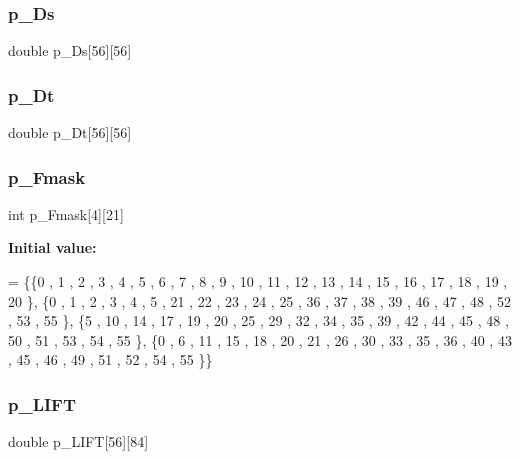 \mbox{\label{a00491_aedc2e177cc4c7f961baa3029cc154e21}} 
\subsubsection{\texorpdfstring{p\+\_\+\+Ds}{p\_Ds}}
{\footnotesize\ttfamily double p\+\_\+\+Ds\mbox{[}56\mbox{]}\mbox{[}56\mbox{]}}

\mbox{\label{a00491_ac1239fe5c431448283c668e5e0377a31}} 
\subsubsection{\texorpdfstring{p\+\_\+\+Dt}{p\_Dt}}
{\footnotesize\ttfamily double p\+\_\+\+Dt\mbox{[}56\mbox{]}\mbox{[}56\mbox{]}}

\mbox{\label{a00491_a4c7b47768e156451f6b08cb0023108ee}} 
\subsubsection{\texorpdfstring{p\+\_\+\+Fmask}{p\_Fmask}}
{\footnotesize\ttfamily int p\+\_\+\+Fmask\mbox{[}4\mbox{]}\mbox{[}21\mbox{]}}

{\bfseries Initial value\+:}
\begin{DoxyCode}
= \{\{0 , 1 , 2 , 3 , 4 , 5 , 6 , 7 , 8 , 9 , 10 , 11 , 12 , 13 , 14 , 15 , 16 , 17 , 18 , 19 , 20 \},
\{0 , 1 , 2 , 3 , 4 , 5 , 21 , 22 , 23 , 24 , 25 , 36 , 37 , 38 , 39 , 46 , 47 , 48 , 52 , 53 , 55 \},
\{5 , 10 , 14 , 17 , 19 , 20 , 25 , 29 , 32 , 34 , 35 , 39 , 42 , 44 , 45 , 48 , 50 , 51 , 53 , 54 , 55 \},
\{0 , 6 , 11 , 15 , 18 , 20 , 21 , 26 , 30 , 33 , 35 , 36 , 40 , 43 , 45 , 46 , 49 , 51 , 52 , 54 , 55 \}\}
\end{DoxyCode}
\mbox{\label{a00491_a06de572ef449eb014ca38b302097b4d9}} 
\subsubsection{\texorpdfstring{p\+\_\+\+L\+I\+FT}{p\_LIFT}}
{\footnotesize\ttfamily double p\+\_\+\+L\+I\+FT\mbox{[}56\mbox{]}\mbox{[}84\mbox{]}}

